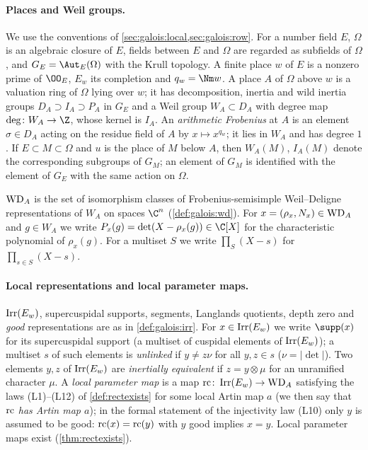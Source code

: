 \paragraph{Places and Weil groups.} We use the conventions of \cref{sec:galois:local,sec:galois:row}. For a number field
$E$, $\Omega$ is an algebraic closure of $E$, fields between $E$ and $\Omega$ are regarded as subfields of $\Omega$, and
$G_E=\Aut_E(\Omega)$ with the Krull topology. A finite place $w$ of $E$ is a nonzero prime of $\OO_E$, $E_w$ its completion and
$q_w=\Nm w$. A place $A$ of $\Omega$ above $w$ is a valuation ring of $\Omega$ lying over $w$; it has
decomposition, inertia and wild inertia groups $D_A\supset I_A\supset P_A$ in $G_E$ and a Weil group
$W_A\subset D_A$ with degree map $\deg\colon W_A\to\Z$, whose kernel is $I_A$. An \emph{arithmetic Frobenius}
at $A$ is an element $\sigma\in D_A$ acting on the residue field of $A$ by $x\mapsto x^{q_w}$; it lies in $W_A$
and has degree $1$. If $E\subset M\subset\Omega$ and $u$ is the place of $M$ below $A$, then $W_A(M)$, $I_A(M)$ denote the
corresponding subgroups of $G_M$; an element of $G_M$ is identified with the element of $G_E$ with the same action on
$\Omega$.

$\mathrm{WD}_A$ is the set of isomorphism classes of Frobenius-semisimple Weil--Deligne representations of
$W_A$ on spaces $\C^n$ (\cref{def:galois:wd}). For $x=(\rho_x,N_x)\in\mathrm{WD}_A$ and $g\in W_A$ we write
$P_x(g)=\det(X-\rho_x(g))\in\C[X]$ for the characteristic polynomial of $\rho_x(g)$. For a multiset $S$ we
write $\prod_S(X-s)$ for $\prod_{s\in S}(X-s)$.

\paragraph{Local representations and local parameter maps.} $\operatorname{Irr}(E_w)$, supercuspidal supports, segments,
Langlands quotients, depth zero and \emph{good} representations are as in \cref{def:galois:irr}. For
$x\in\operatorname{Irr}(E_w)$ we write $\supp(x)$ for its supercuspidal support (a multiset of cuspidal elements of
$\operatorname{Irr}(E_w)$); a multiset $s$ of such elements is \emph{unlinked} if $y\ne z\nu$ for all $y,z\in s$
($\nu=|\det|$). Two elements $y,z$ of $\operatorname{Irr}(E_w)$ are \emph{inertially equivalent} if $z=y\otimes\mu$ for an
unramified character $\mu$. A \emph{local parameter map} is a map $\mathrm{rc}\colon\operatorname{Irr}(E_w)\to\mathrm{WD}_A$
satisfying the laws (L1)--(L12) of \cref{def:rectexists} for some local Artin map $a$ (we then say that
$\mathrm{rc}$ \emph{has Artin map $a$}); in the formal statement of the injectivity law (L10) only $y$ is assumed
to be good: $\mathrm{rc}(x)=\mathrm{rc}(y)$ with $y$ good implies $x=y$. Local parameter maps exist
(\cref{thm:rectexists}).

